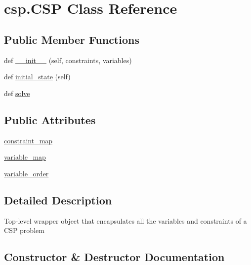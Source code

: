 \hypertarget{classcsp_1_1_c_s_p}{}\section{csp.\+C\+S\+P Class Reference}
\label{classcsp_1_1_c_s_p}
\subsection*{Public Member Functions}
\begin{DoxyCompactItemize}
\item 
def \hyperlink{classcsp_1_1_c_s_p_a62c6c3b56c1dc8c0a3554c46a030a1a8}{\+\_\+\+\_\+init\+\_\+\+\_\+} (self, constraints, variables)
\item 
def \hyperlink{classcsp_1_1_c_s_p_a0761da7d547113252312d3aefdf2865a}{initial\+\_\+state} (self)
\item 
def \hyperlink{classcsp_1_1_c_s_p_a3a11bac70a871ced6790bb527a704ee0}{solve}
\end{DoxyCompactItemize}
\subsection*{Public Attributes}
\begin{DoxyCompactItemize}
\item 
\hyperlink{classcsp_1_1_c_s_p_ab5c8a0bf07c71c7fef1e965df2cdbffa}{constraint\+\_\+map}
\item 
\hyperlink{classcsp_1_1_c_s_p_a12546b7e4b640257429c6b39cd561837}{variable\+\_\+map}
\item 
\hyperlink{classcsp_1_1_c_s_p_a25e138ab056f90e123b27985f341b96c}{variable\+\_\+order}
\end{DoxyCompactItemize}


\subsection{Detailed Description}
\begin{DoxyVerb}Top-level wrapper object that encapsulates all the
variables and constraints of a CSP problem
\end{DoxyVerb}
 

\subsection{Constructor \& Destructor Documentation}
\hypertarget{classcsp_1_1_c_s_p_a62c6c3b56c1dc8c0a3554c46a030a1a8}{}
